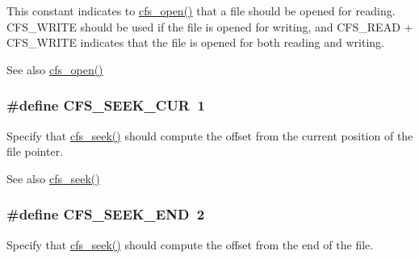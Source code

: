 This constant indicates to \hyperlink{group__cfs_gadc1727a1a27a40a8483135425a42c5de}{cfs\+\_\+open()} that a file should be opened for reading. C\+F\+S\+\_\+\+W\+R\+I\+T\+E should be used if the file is opened for writing, and C\+F\+S\+\_\+\+R\+E\+A\+D + C\+F\+S\+\_\+\+W\+R\+I\+T\+E indicates that the file is opened for both reading and writing.

\begin{DoxySeeAlso}{See also}
\hyperlink{group__cfs_gadc1727a1a27a40a8483135425a42c5de}{cfs\+\_\+open()} 
\end{DoxySeeAlso}
\hypertarget{group__cfs_ga79a4ba5a9b5924df5db6e998e84a7d53}{}
\subsubsection[{C\+F\+S\+\_\+\+S\+E\+E\+K\+\_\+\+C\+U\+R}]{\setlength{\rightskip}{0pt plus 5cm}\#define C\+F\+S\+\_\+\+S\+E\+E\+K\+\_\+\+C\+U\+R~1}\label{group__cfs_ga79a4ba5a9b5924df5db6e998e84a7d53}
Specify that \hyperlink{group__cfs_ga116cdc7036a99707477b50bd496fa1c1}{cfs\+\_\+seek()} should compute the offset from the current position of the file pointer.

\begin{DoxySeeAlso}{See also}
\hyperlink{group__cfs_ga116cdc7036a99707477b50bd496fa1c1}{cfs\+\_\+seek()} 
\end{DoxySeeAlso}
\hypertarget{group__cfs_ga96fb6bf3f2e9f69d526f9119551bedce}{}
\subsubsection[{C\+F\+S\+\_\+\+S\+E\+E\+K\+\_\+\+E\+N\+D}]{\setlength{\rightskip}{0pt plus 5cm}\#define C\+F\+S\+\_\+\+S\+E\+E\+K\+\_\+\+E\+N\+D~2}\label{group__cfs_ga96fb6bf3f2e9f69d526f9119551bedce}
Specify that \hyperlink{group__cfs_ga116cdc7036a99707477b50bd496fa1c1}{cfs\+\_\+seek()} should compute the offset from the end of the file.

